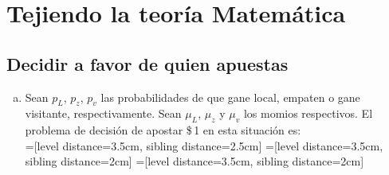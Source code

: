 \chapter{Tejiendo la teoría Matemática}

\section{Decidir a favor de quien apuestas}

\begin{enumerate}[(a)]
 \item Sean $p_L$, $p_z$, $p_v$ las probabilidades de que gane local, empaten o gane visitante, respectivamente. Sean $\mu_L$, $\mu_z$ y $\mu_v$ los momios respectivos. El problema de decisión de apostar \$\,1 en esta situación es:\\
 
=[level distance=3.5cm, sibling distance=2.5cm]
=[level distance=3.5cm, sibling distance=2cm]
=[level distance=3.5cm, sibling distance=2cm]



\end{enumerate}
